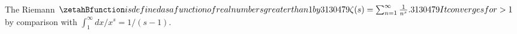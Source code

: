 The Riemann $\zetahBfunction is defined as a function of real numbers greater than 1 by
3130479\zeta(s) = \sum_{n=1}^{\infty} \frac{1}{n^s}.3130479
It converges for  > 1$ by comparison with $\int_1^\infty dx/x^s = 1/(s-1)$.
